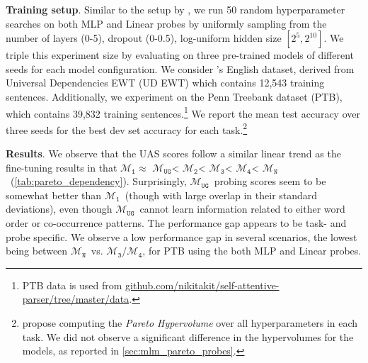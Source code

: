 \documentclass[letterpaper, 12pt]{report}
\newcommand{\xhdr}[1]{{\noindent\bfseries #1}.}
\newcommand{\OR}{$\mathcal{M}_{\texttt{N}}$}
\newcommand{\RI}{$\mathcal{M}_{\texttt{1}}$}
\newcommand{\RII}{$\mathcal{M}_{\texttt{2}}$}
\newcommand{\RIII}{$\mathcal{M}_{\texttt{3}}$}
\newcommand{\RIV}{$\mathcal{M}_{\texttt{4}}$}
\newcommand{\RC}{$\mathcal{M}_{\texttt{UG}}$}
\begin{document}
\xhdr{Training setup} Similar to the setup by \citet{pimentel-etal-2020-pareto}, we run 50 random hyperparameter searches on both MLP and Linear probes by uniformly sampling from the number of layers (0-5), dropout (0-0.5), log-uniform hidden size $[2^{5}, 2^{10}]$. We triple this experiment size by evaluating on three pre-trained models of different seeds for each model configuration.
We consider \citeauthor{pimentel-etal-2020-pareto}'s English dataset, derived from Universal Dependencies EWT (UD EWT) \cite{bies2012english, silveira2014gold} which contains 12,543 training sentences.
Additionally, we experiment on the Penn Treebank dataset (PTB), which contains 39,832 training sentences.\footnote{PTB data \citep{kitaev-etal-2019-multilingual} is used from \href{https://github.com/nikitakit/self-attentive-parser/tree/master/data}{github.com/nikitakit/self-attentive-parser/tree/master/data}.}
We report the mean test accuracy over three seeds for the best dev set accuracy for each task.\footnote{\citet{pimentel-etal-2020-pareto} propose computing the \textit{Pareto Hypervolume} over all hyperparameters in each task. We did not observe a significant difference in the hypervolumes for the models, as reported in \autoref{sec:mlm_pareto_probes}.}





\xhdr{Results} We observe that
the UAS scores follow a similar linear trend as the fine-tuning results in that \RI $\approx$ \RC < \RII < \RIII < \RIV < \OR\ (\autoref{tab:pareto_dependency}).
Surprisingly, \RC\ probing scores seem to be somewhat better than \RI\ (though with large overlap in their standard deviations), even though \RC\ cannot learn information related to either word order or co-occurrence patterns.
The performance gap appears to be task- and probe specific.
We observe a low performance gap in several scenarios, the lowest being between \OR\ vs. \RIII/\RIV, for PTB using the both MLP and Linear probes.
\end{document}
